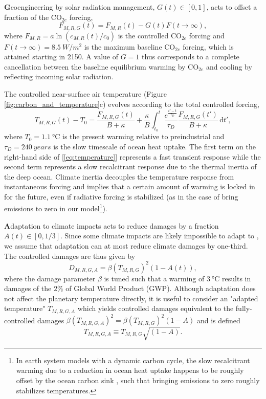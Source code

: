 \documentclass[9pt,twocolumn,twoside,lineno]{pnas-new}
\begin{document}
\textbf{G}eoengineering by solar radiation management, $G(t) \in [0,1]$, acts to offset a fraction of the CO$_{2e}$ forcing, 
\begin{equation}
    F_{M,R,G}(t) = F_{M,R}(t) - G(t) F(t \rightarrow \infty),
\end{equation}
where $F_{M,R} = a \ln(c_{M,R}(t) / c_{0})$ is the controlled CO$_{2e}$ forcing and $F(t \rightarrow \infty) = \SI{8.5}{W/m^{2}}$ is the maximum baseline CO$_{2e}$ forcing, which is attained starting in 2150. A value of $G = 1$ thus corresponds to a complete cancellation between the baseline equilibrium warming by CO$_{2e}$ and cooling by reflecting incoming solar radiation.

The controlled near-surface air temperature (Figure \ref{fig:carbon_and_temperature}c) evolves according to the total controlled forcing,
\begin{equation}
    T_{M,R,G}(t) - T_{0} = \frac{F_{M,R,G}(t)}{B + \kappa} + \frac{\kappa}{B} \int_{t_{0}}^{t} \frac{e^{\frac{t'-t}{\tau_{D}}}}{\tau_{D}} \frac{F_{M,R,G}(t')}{B+\kappa} \, \text{d}t',
    \label{eq:temperature}
\end{equation}
where $T_{0} = \SI{1.1}{\celsius}$ is the present warming relative to preindustrial and $\tau_{D} = \SI{240}{years}$ is the slow timescale of ocean heat uptake. The first term on the right-hand side of [\ref{eq:temperature}] represents a fast transient response while the second term represents a slow recalcitrant response due to the thermal inertia of the deep ocean. Climate inertia decouples the temperature response from instantaneous forcing and implies that a certain amount of warming is locked in for the future, even if radiative forcing is stabilized (as in the case of bring emissions to zero in our model\footnote{In earth system models with a dynamic carbon cycle, the slow recalcitrant warming due to a reduction in ocean heat uptake happens to be roughly offset by the ocean carbon sink \cite{solomon_irreversible_2009,lickley_time_2019}, such that bringing emissions to zero roughly stabilizes temperatures.}).

\textbf{A}daptation to climate impacts acts to reduce damages by a fraction $A(t) \in [0, 1/3]$. Since some climate impacts are likely impossible to adapt to \cite[][]{sherwood_adaptability_2010}, we assume that adaptation can at most reduce climate damages by one-third. The controlled damages are thus given by
\begin{equation}
    D_{M,R,G,A} = \beta (T_{M,R,G})^{2} (1-A(t)),
    \label{eq:damages}
\end{equation}
where the damage parameter $\beta$ is tuned such that a warming of $\SI{3}{\celsius}$ results in damages of the $2\%$ of Global World Product (GWP). Although adaptation does not affect the planetary temperature directly, it is useful to consider an "adapted temperature" $T_{M,R,G,A}$ which yields controlled damages equivalent to the fully-controlled damages $\beta (T_{M,R,G,A})^{2} = \beta (T_{M,R,G})^{2} (1-A)$ and is defined
\begin{equation}
    T_{M,R,G,A} \equiv T_{M,R,G} \sqrt{(1-A)}.\label{eq.adapted_temperature}
\end{equation}
\end{document}
